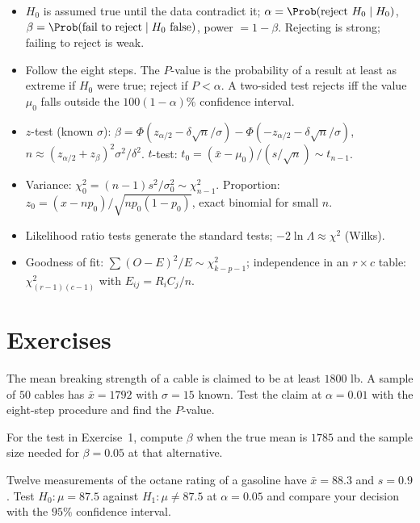 \begin{summarybox}
\begin{itemize}
  \item $H_0$ is assumed true until the data contradict it; $\alpha=\Prob(\text{reject }H_0\mid H_0)$, $\beta=\Prob(\text{fail to reject}\mid H_0\text{ false})$, power $=1-\beta$. Rejecting is strong; failing to reject is weak.
  \item Follow the eight steps. The $P$-value is the probability of a result at least as extreme if $H_0$ were true; reject if $P<\alpha$. A two-sided test rejects iff the value $\mu_0$ falls outside the $100(1-\alpha)\%$ confidence interval.
  \item $z$-test (known $\sigma$): $\beta=\Phi(z_{\alpha/2}-\delta\sqrt n/\sigma)-\Phi(-z_{\alpha/2}-\delta\sqrt n/\sigma)$, $n\approx(z_{\alpha/2}+z_\beta)^2\sigma^2/\delta^2$. $t$-test: $t_0=(\bar{x}-\mu_0)/(s/\sqrt n)\sim t_{n-1}$.
  \item Variance: $\chi_0^2=(n-1)s^2/\sigma_0^2\sim\chi^2_{n-1}$. Proportion: $z_0=(x-np_0)/\sqrt{np_0(1-p_0)}$, exact binomial for small $n$.
  \item Likelihood ratio tests generate the standard tests; $-2\ln\Lambda\approx\chi^2$ (Wilks).
  \item Goodness of fit: $\sum(O-E)^2/E\sim\chi^2_{k-p-1}$; independence in an $r\times c$ table: $\chi^2_{(r-1)(c-1)}$ with $E_{ij}=R_iC_j/n$.
\end{itemize}
\end{summarybox}

\section{Exercises}

\begin{exercise}
The mean breaking strength of a cable is claimed to be at least $1800$ lb. A sample of $50$ cables has $\bar{x}=1792$ with $\sigma=15$ known. Test the claim at $\alpha=0.01$ with the eight-step procedure and find the $P$-value.
\end{exercise}

\begin{exercise}
For the test in Exercise~1, compute $\beta$ when the true mean is $1785$ and the sample size needed for $\beta=0.05$ at that alternative.
\end{exercise}

\begin{exercise}
Twelve measurements of the octane rating of a gasoline have $\bar{x}=88.3$ and $s=0.9$. Test $H_0:\mu=87.5$ against $H_1:\mu\ne87.5$ at $\alpha=0.05$ and compare your decision with the $95\%$ confidence interval.
\end{exercise}

